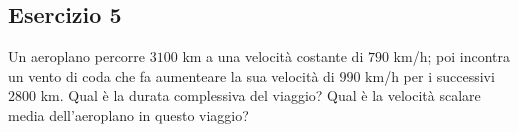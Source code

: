 \documentclass[12pt,a4paper]{book}
\begin{document}


\subsection*{Esercizio 5}
Un aeroplano percorre $3100$ km a una velocità costante di $790$ km/h; poi incontra un vento di coda che fa aumenteare la sua velocità di $990$ km/h per i successivi $2800$ km. Qual è la durata complessiva del viaggio? Qual è la velocità scalare media dell'aeroplano in questo viaggio?

\end{document}
